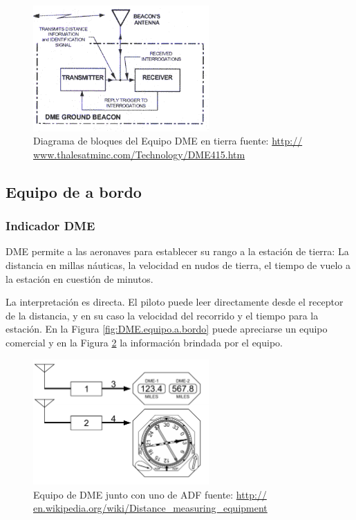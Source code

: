 \begin{figure}[!h]
  \centering
  \includegraphics[width=0.6\textwidth]{06.radionavegacion/Imagenes/06.04.dme.imagenes/DMEtheoryGround.gif}
  \caption{Diagrama de bloques del Equipo DME en tierra {\tiny 
fuente: \url{http://
www.thalesatminc.com/Technology/DME415.htm
}}}
  \label{fig:DME.equipo.tierra.diagrama.bloques}
\end{figure}

\subsection{Equipo de a bordo }
\label{sec:DME.equipo.a.bordo}

\subsubsection{Indicador DME}
\label{sec:DME.indicador}

DME permite a las aeronaves para establecer su rango a la estaci\'on de tierra: La distancia en millas n\'auticas, la velocidad en nudos de tierra, el tiempo de vuelo a la estaci\'on en cuesti\'on de minutos. 

La interpretaci\'on es directa. El piloto puede leer directamente desde el receptor de la distancia, y en su caso la velocidad del recorrido y el tiempo para la estaci\'on.  En la Figura \ref{fig:DME.equipo.a.bordo} puede apreciarse un equipo comercial y en la Figura \ref{fig:DME.instalacion.a.bordo} la informaci\'on brindada por el equipo.


\begin{figure}[!h]
  \centering
  \includegraphics[width=0.6\textwidth]{06.radionavegacion/Imagenes/06.04.dme.imagenes/DME_VOR_avionics.PNG}
  \caption{Equipo de DME junto con uno de ADF 
{\tiny fuente: \url{http://
en.wikipedia.org/wiki/Distance_measuring_equipment
}}
}
  \label{fig:DME.instalacion.a.bordo}
\end{figure}



